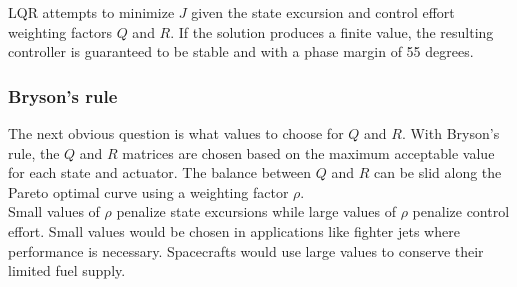 LQR attempts to minimize $J$ given the \gls{state} excursion and control effort
weighting factors $Q$ and $R$. If the solution produces a finite value, the
resulting controller is guaranteed to be stable and 
with a \gls{phase margin} of 55 degrees.

\subsubsection{Bryson's rule}

The next obvious question is what values to choose for $Q$ and $R$. With
Bryson's rule, the $Q$ and $R$ matrices are chosen based on the maximum
acceptable value for each \gls{state} and actuator. The balance between $Q$ and
$R$ can be slid along the Pareto optimal curve using a weighting factor $\rho$.
\\

Small values of $\rho$ penalize \gls{state} excursions while large values of
$\rho$ penalize control effort. Small values would be chosen in applications
like fighter jets where performance is necessary. Spacecrafts would use large
values to conserve their limited fuel supply.
